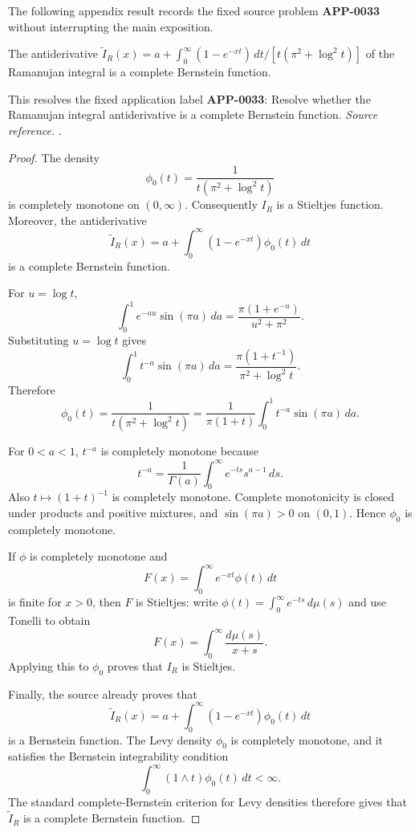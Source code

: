 The following appendix result records the fixed source problem \textbf{APP-0033} without interrupting the main exposition.
\begin{corollary}
\label{res:ramanujan-antiderivative-complete-bernstein}
The antiderivative \(\widetilde I_R(x)=a+\int_0^\infty(1-e^{-xt})\,dt/[t(\pi^2+\log^2 t)]\) of the Ramanujan integral is a complete Bernstein function.

This resolves the fixed application label \textbf{APP-0033}: Resolve whether the Ramanujan integral antiderivative is a complete Bernstein function.
\emph{Source reference.} \cite{app-app-0033-source}.
\end{corollary}
\begin{proof}
The density
\[
\phi_0(t)=\frac{1}{t(\pi^2+\log^2 t)}
\]
is completely monotone on \((0,\infty)\). Consequently \(I_R\) is a Stieltjes function. Moreover, the antiderivative
\[
\widetilde I_R(x)=a+\int_0^\infty (1-e^{-xt})\phi_0(t)\,dt
\]
is a complete Bernstein function.

For \(u=\log t\),
\[
\int_0^1 e^{-au}\sin(\pi a)\,da
=\frac{\pi(1+e^{-u})}{u^2+\pi^2}.
\]
Substituting \(u=\log t\) gives
\[
\int_0^1 t^{-a}\sin(\pi a)\,da
=\frac{\pi(1+t^{-1})}{\pi^2+\log^2 t}.
\]
Therefore
\[
\phi_0(t)
=\frac{1}{t(\pi^2+\log^2 t)}
=\frac{1}{\pi(1+t)}\int_0^1 t^{-a}\sin(\pi a)\,da.
\]

For \(0<a<1\), \(t^{-a}\) is completely monotone because
\[
t^{-a}=\frac1{\Gamma(a)}\int_0^\infty e^{-ts}s^{a-1}\,ds.
\]
Also \(t\mapsto(1+t)^{-1}\) is completely monotone. Complete monotonicity is closed under products and positive mixtures, and \(\sin(\pi a)>0\) on \((0,1)\). Hence \(\phi_0\) is completely monotone.

If \(\phi\) is completely monotone and
\[
F(x)=\int_0^\infty e^{-xt}\phi(t)\,dt
\]
is finite for \(x>0\), then \(F\) is Stieltjes: write \(\phi(t)=\int_0^\infty e^{-ts}\,d\mu(s)\) and use Tonelli to obtain
\[
F(x)=\int_0^\infty\frac{d\mu(s)}{x+s}.
\]
Applying this to \(\phi_0\) proves that \(I_R\) is Stieltjes.

Finally, the source already proves that
\[
\widetilde I_R(x)=a+\int_0^\infty (1-e^{-xt})\phi_0(t)\,dt
\]
is a Bernstein function. The Levy density \(\phi_0\) is completely monotone, and it satisfies the Bernstein integrability condition
\[
\int_0^\infty (1\wedge t)\phi_0(t)\,dt<\infty.
\]
The standard complete-Bernstein criterion for Levy densities therefore gives that \(\widetilde I_R\) is a complete Bernstein function.
\end{proof}

